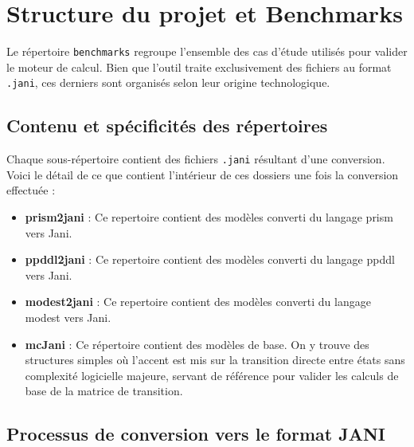 \documentclass[14pt, a4paper]{extarticle}
\begin{document}
\section{Structure du projet et Benchmarks}

Le répertoire \texttt{benchmarks} regroupe l'ensemble des cas d'étude utilisés pour valider le moteur de calcul. Bien que l'outil traite exclusivement des fichiers au format \texttt{.jani}, ces derniers sont organisés selon leur origine technologique.

\begin{center}
\end{center}

\subsection{Contenu et spécificités des répertoires}

Chaque sous-répertoire contient des fichiers \texttt{.jani} résultant d'une conversion. Voici le détail de ce que contient l'intérieur de ces dossiers une fois la conversion effectuée :

\begin{itemize}
    \item \textbf{prism2jani} : Ce repertoire contient des modèles converti du langage prism vers Jani.
    
    \item \textbf{ppddl2jani} : Ce repertoire contient des modèles converti du langage ppddl vers Jani.
    
    \item \textbf{modest2jani} : Ce repertoire contient des modèles converti du langage modest vers Jani.
    
    \item \textbf{mcJani} : Ce répertoire contient des modèles de base. On y trouve des structures simples où l'accent est mis sur la transition directe entre états sans complexité logicielle majeure, servant de référence pour valider les calculs de base de la matrice de transition.
\end{itemize}

\subsection{Processus de conversion vers le format JANI}
\end{document}
